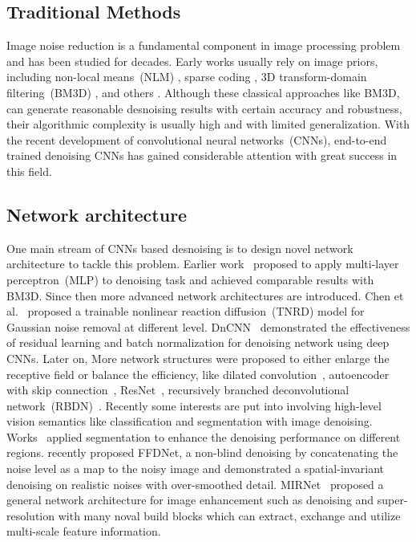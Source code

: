 \documentclass[final]{cvpr}
\begin{document}
\subsection{Traditional Methods}


Image noise reduction is a fundamental component in image processing problem and has been studied for decades. Early works usually rely on image priors, including non-local means~(NLM) \cite{buades2005non}, sparse coding \cite{elad2006image,mairal2009non,aharon2006k}, 3D transform-domain filtering~(BM3D) \cite{dabov2007image}, and others \cite{gu2014weighted,portilla2003image}. Although these classical approaches like BM3D, can generate reasonable desnoising results with certain accuracy and robustness, their algorithmic complexity is usually high and with limited generalization. With the recent development of convolutional neural networks~(CNNs),  end-to-end trained denoising CNNs has gained considerable attention with great success in this field. 


\subsection{Network architecture}

One main stream of CNNs based desnoising is to design novel network architecture to tackle this problem. Earlier work~\cite{burger2012image} proposed to apply multi-layer perceptron~(MLP) to denoising task and achieved comparable results with BM3D. Since then more advanced network architectures are introduced. Chen et al.~\cite{chen2017trainable} proposed a trainable nonlinear reaction diffusion~(TNRD) model for Gaussian noise removal at different level. DnCNN~\cite{zhang2017beyond} demonstrated the effectiveness of residual learning and batch normalization for denoising network using deep CNNs.  Later on, More network structures were proposed to either enlarge the receptive field or balance the efficiency, like dilated convolution~\cite{zhang2017learning}, autoencoder with skip connection~\cite{mao2016image}, ResNet~\cite{ren2018dn}, recursively branched deconvolutional network~(RBDN)~\cite{santhanam2017generalized}. Recently some interests are put into involving high-level vision semantics like classification and segmentation with image denoising. Works~\cite{liu2017image, niknejad2017class} applied segmentation to enhance the denoising performance on different regions. \cite{zhang2018ffdnet} recently proposed FFDNet, a non-blind denoising by concatenating the noise level as a map to the noisy image and demonstrated a spatial-invariant denoising on realistic noises with over-smoothed detail. MIRNet~\cite{zamir2020learning} proposed a general network architecture for image enhancement such as denoising and super-resolution with many noval
build blocks which can extract, exchange and utilize multi-scale feature information.
\end{document}
